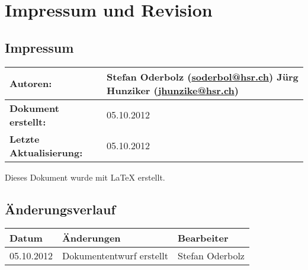 \chapter*{Impressum und Revision}

\section*{Impressum}
\begin{table}[H] 
\centering 
\begin{tabular}{|p{0.35\twocelltabwidth}|p{0.65\twocelltabwidth}|}
\hline 
\textbf{Autoren:} & Stefan Oderbolz (\url{soderbol@hsr.ch}) \newline
Jürg Hunziker (\url{jhunzike@hsr.ch}) \\ 
\hline 
\textbf{Dokument erstellt:} & 05.10.2012 \\ 
\hline 
\textbf{Letzte Aktualisierung:} & 05.10.2012 \\ 
\hline 
\end{tabular}
\end{table}

Dieses Dokument wurde mit \LaTeX{} erstellt.

\section*{Änderungsverlauf}

\begin{longtable}{|p{0.15\threecelltabwidth}|p{0.65\threecelltabwidth}|p{0.2\threecelltabwidth}|}
\hline 
\textbf{Datum} & \textbf{Änderungen} & \textbf{Bearbeiter} \\ 
\hline 
05.10.2012 & Dokumententwurf erstellt & Stefan Oderbolz \\ 
\hline 
\end{longtable} 